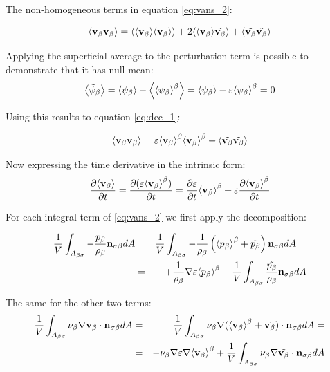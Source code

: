 The non-homogeneous terms in equation \ref{eq:vans_2}:

\begin{equation}
{\left< \textbf{v}_{\beta}\textbf{v}_{\beta}\right>} = {\left< {\left< \textbf{v}_{\beta} \right>}{\left< \textbf{v}_{\beta} \right>} \right>} +2{\left< {\left< \textbf{v}_{\beta} \right>}\tilde{\textbf{v}_{\beta}} \right>} +{\left< \tilde{\textbf{v}_{\beta}} \tilde{\textbf{v}_{\beta}} \right>}
\label{eq:dec_1}
\end{equation}

Applying the superficial average to the perturbation term is possible to demonstrate that it has null mean:
$$
{\left< \tilde{\psi}_{\beta} \right>} = {\left< \psi_{\beta} \right>} - {\left< {\left< \psi_{\beta} \right>}^{\beta} \right>} = {\left< \psi_{\beta} \right>} -\varepsilon {\left< \psi_{\beta} \right>}^{\beta} = 0
$$

Using this results to equation \eqref{eq:dec_1}:

\begin{equation}
{\left< \textbf{v}_{\beta}\textbf{v}_{\beta}\right>} = \varepsilon {\left< \textbf{v}_{\beta}\right>}^{\beta}{\left< \textbf{v}_{\beta} \right>}^{\beta} +{\left< \tilde{\textbf{v}_{\beta}} \tilde{\textbf{v}_{\beta}} \right>}
\end{equation}

Now expressing the time derivative in the intrinsic form:
$$
\frac{\partial {\left< \textbf{v}_{\beta}\right>}}{\partial t} = \frac{\partial (\varepsilon{\left< \textbf{v}_{\beta}\right>}^{\beta})}{\partial t} = \frac{\partial \varepsilon}{\partial t}{\left< \textbf{v}_{\beta} \right>}^{\beta} + \varepsilon \frac{\partial {\left< \textbf{v}_{\beta}\right>}^{\beta}}{\partial t}
$$

For each integral term of \ref{eq:vans_2} we first apply the decomposition:

\begin{eqnarray}
\dfrac{1}{V} \int_{A_{\beta \sigma}}  -\dfrac{p_{\beta}}{\rho_{\beta}} \mathbf{n}_{\sigma \beta} dA &=& \dfrac{1}{V} \int_{A_{\beta \sigma}}  -\dfrac{1}{\rho_{\beta}} \left({\left< p_{\beta} \right>}^{\beta}  + \tilde{p_{\beta}}\right) \mathbf{n}_{\sigma \beta} dA = \nonumber \\
&=& +\dfrac{1}{\rho_{\beta}}\nabla\varepsilon {\left< p_{\beta}\right>}^{\beta} - \dfrac{1}{V} \int_{A_{\beta \sigma}} \dfrac{\tilde{p_{\beta}}}{\rho_{\beta}} \mathbf{n}_{\sigma \beta} dA
\end{eqnarray}

The same for the other two terms:
\begin{eqnarray}
\dfrac{1}{V} \int_{A_{\beta \sigma}} \nu_{\beta} \nabla \textbf{v}_{\beta} \cdot \mathbf{n}_{\sigma \beta} dA &=& \dfrac{1}{V} \int_{A_{\beta \sigma}} \nu_{\beta} \nabla ({\left< \textbf{v}_{\beta} \right>}^{\beta} +\tilde{\textbf{v}_{\beta}}) \cdot \mathbf{n}_{\sigma \beta} dA =  \nonumber \\
&=& - \nu_{\beta} \nabla \varepsilon \nabla {\left< \textbf{v}_{\beta}\right>}^{\beta} + \dfrac{1}{V} \int_{A_{\beta \sigma}} \nu_{\beta} \nabla \tilde{\textbf{v}_{\beta}} \cdot \mathbf{n}_{\sigma \beta} dA
\end{eqnarray}

